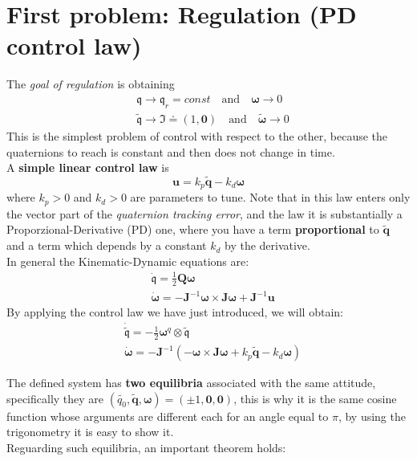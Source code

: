 \section{First problem: Regulation (PD control law)}
The \textit{goal of regulation} is obtaining
\begin{align*}
    &\mathfrak{q} \to \mathfrak{q}_r = const  \quad \text{and} \quad \boldsymbol{\omega}\to0\\
    &\tilde{\mathfrak{q}}\to\mathfrak{I}\doteq(1,\mathbf{0}) \quad \text{and} \quad \boldsymbol{\tilde{\omega}}\to0
\end{align*}
This is the simplest problem of control with respect to the other, because the quaternions to reach is constant and then does not change in time.\\
A  \textbf{simple linear control  law} is
{\large{
    \begin{equation}
        \mathbf{u} = k_p\tilde{\mathbf{q}}-k_d\boldsymbol{\omega}
    \end{equation}
}}
where $k_p>0$ and $k_d>0$ are parameters to tune. Note that in this law enters only the vector part of the \textit{quaternion tracking error}, and the law it is substantially a Proporzional-Derivative (PD) one, where you have a term \textbf{proportional} to $\tilde{\mathbf{q}}$ and a term which depends by a constant $k_d$ by the derivative.\\
In general the Kinematic-Dynamic equations are:
{\large{
    \begin{align*}
        &\dot{\mathfrak{q}} = \frac{1}{2}\mathbf{Q}\boldsymbol{\omega}\\
        &\dot{\boldsymbol{\omega}} = -\mathbf{J}^{-1}\boldsymbol{\omega} \times \mathbf{J}\boldsymbol{\omega}+\mathbf{J}^{-1}\mathbf{u}
    \end{align*}
}}
By applying the control law we have just introduced, we will obtain:
{\large{
    \begin{align*}
        &\dot{\tilde{\mathfrak{q}}} = -\frac{1}{2}\boldsymbol{\omega}^q \otimes \tilde{\mathfrak{q}}\\
        &\dot{\boldsymbol{\omega}} = -\mathbf{J}^{-1}(-\boldsymbol{\omega} \times \mathbf{J}\boldsymbol{\omega}+k_p\tilde{\mathbf{q}}-k_d\boldsymbol{\omega})
    \end{align*}
}}

The defined system has \textbf{two equilibria} associated with the same attitude, specifically they are $(\tilde{q_0}, \tilde{\mathbf{q}}, \boldsymbol{\omega})=(\pm1,\mathbf{0, 0})$, this is why it is the same cosine function whose arguments are different each for an angle equal to $\pi$, by using the trigonometry it is easy to show it.\\
Reguarding such equilibria, an important theorem holds:\\

